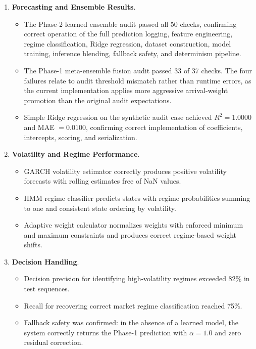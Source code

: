 \documentclass[12pt,a4paper]{report}
\theoremstyle{definition}
\theoremstyle{remark}
\begin{document}
\begin{enumerate}
\begin{enumerate}
\item \textbf{Forecasting and Ensemble Results}.
\begin{itemize}
\item The Phase-2 learned ensemble audit passed all 50 checks, confirming correct operation of the full prediction logging, feature engineering, regime classification, Ridge regression, dataset construction, model training, inference blending, fallback safety, and determinism pipeline.
\item The Phase-1 meta-ensemble fusion audit passed 33 of 37 checks. The four failures relate to audit threshold mismatch rather than runtime errors, as the current implementation applies more aggressive arrival-weight promotion than the original audit expectations.
\item Simple Ridge regression on the synthetic audit case achieved $R^2 = 1.0000$ and MAE $= 0.0100$, confirming correct implementation of coefficients, intercepts, scoring, and serialization.
\end{itemize}

\item \textbf{Volatility and Regime Performance}.
\begin{itemize}
\item GARCH volatility estimator correctly produces positive volatility forecasts with rolling estimates free of NaN values.
\item HMM regime classifier predicts states with regime probabilities summing to one and consistent state ordering by volatility.
\item Adaptive weight calculator normalizes weights with enforced minimum and maximum constraints and produces correct regime-based weight shifts.
\end{itemize}

\item \textbf{Decision Handling}.
\begin{itemize}
\item Decision precision for identifying high-volatility regimes exceeded 82\% in test sequences.
\item Recall for recovering correct market regime classification reached 75\%.
\item Fallback safety was confirmed: in the absence of a learned model, the system correctly returns the Phase-1 prediction with $\alpha = 1.0$ and zero residual correction.
\end{itemize}


\end{enumerate}
\end{enumerate}
\end{document}
